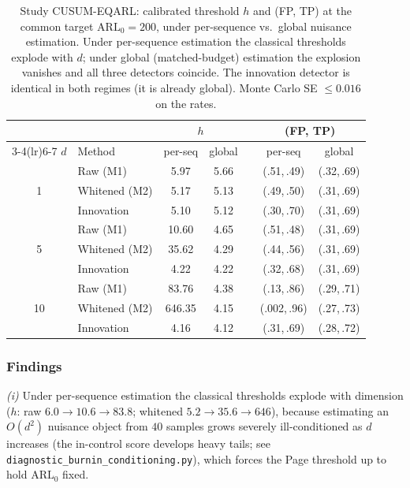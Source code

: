\documentclass[bj,authoryear]{imsart}
\theoremstyle{plain}
\theoremstyle{definition}
\begin{document}
\begin{table}[ht]
\centering
\caption{Study CUSUM-EQARL: calibrated threshold $h$ and (FP, TP) at the
  common target $\mathrm{ARL}_0=200$, under per-sequence vs.\ global nuisance
  estimation.  Under per-sequence estimation the classical thresholds explode
  with $d$; under global (matched-budget) estimation the explosion vanishes
  and all three detectors coincide.  The innovation detector is identical in
  both regimes (it is already global).  Monte Carlo SE $\leq 0.016$ on the
  rates.}
\label{tab:eqarl}
\small
\begin{tabular}{cl cc c cc}
\toprule
 & & \multicolumn{2}{c}{$h$} & & \multicolumn{2}{c}{(FP, TP)} \\
\cmidrule(lr){3-4}\cmidrule(lr){6-7}
$d$ & Method & per-seq & global & & per-seq & global \\
\midrule
\multirow{3}{*}{1}
  & Raw (M1)      & 5.97 & 5.66 & & (.51,\,.49) & (.32,\,.69) \\
  & Whitened (M2) & 5.17 & 5.13 & & (.49,\,.50) & (.31,\,.69) \\
  & Innovation    & 5.10 & 5.12 & & (.30,\,.70) & (.31,\,.69) \\
\midrule
\multirow{3}{*}{5}
  & Raw (M1)      & 10.60 & 4.65 & & (.51,\,.48) & (.31,\,.69) \\
  & Whitened (M2) & 35.62 & 4.29 & & (.44,\,.56) & (.31,\,.69) \\
  & Innovation    & 4.22  & 4.22 & & (.32,\,.68) & (.31,\,.69) \\
\midrule
\multirow{3}{*}{10}
  & Raw (M1)      & 83.76  & 4.38 & & (.13,\,.86) & (.29,\,.71) \\
  & Whitened (M2) & 646.35 & 4.15 & & (.002,\,.96) & (.27,\,.73) \\
  & Innovation    & 4.16   & 4.12 & & (.31,\,.69) & (.28,\,.72) \\
\bottomrule
\end{tabular}
\end{table}

\subsubsection*{Findings}
\emph{(i)} Under per-sequence estimation the classical thresholds explode
with dimension ($h$: raw $6.0\to10.6\to83.8$; whitened $5.2\to35.6\to646$),
because estimating an $O(d^2)$ nuisance object from $40$ samples grows
severely ill-conditioned as $d$ increases (the in-control score develops
heavy tails; see \texttt{diagnostic\_burnin\_conditioning.py}), which forces
the Page threshold up to hold $\mathrm{ARL}_0$ fixed.
\end{document}
